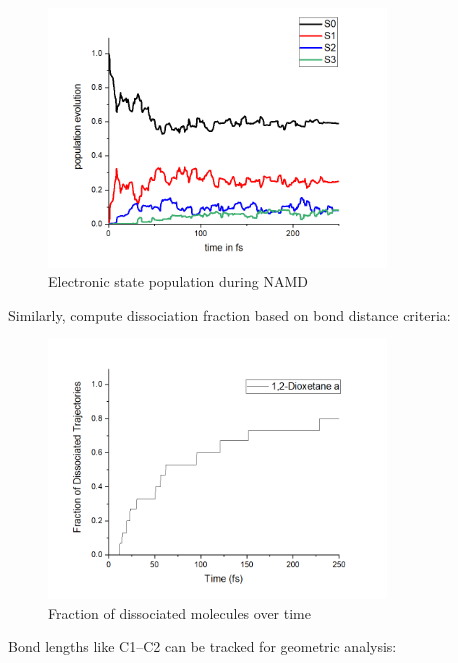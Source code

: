 \begin{figure}[h]
    \centering
    \includegraphics[width=0.8\textwidth]{docs/img/population_evolution.png}
    \caption{Electronic state population during NAMD}
\end{figure}

Similarly, compute dissociation fraction based on bond distance criteria:

\begin{figure}[h]
    \centering
    \includegraphics[width=0.8\textwidth]{docs/img/dissociation_fraction.png}
    \caption{Fraction of dissociated molecules over time}
\end{figure}

Bond lengths like C1–C2 can be tracked for geometric analysis:

